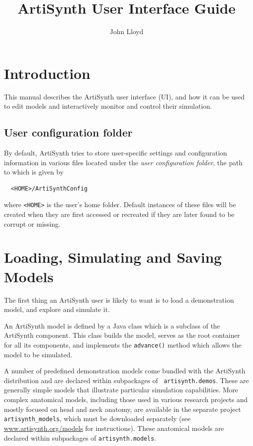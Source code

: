 \documentclass{article}
\title{ArtiSynth User Interface Guide}
\author{John Lloyd}
\date{}
\begin{document}
\maketitle

\iflatexml{\large\pubdate}\fi

\tableofcontents

\section{Introduction}

This manual describes the ArtiSynth user interface (UI), and how it
can be used to edit models and interactively monitor and control their
simulation.

\subsection{User configuration folder}
\label{UserConfig:sec}

By default, ArtiSynth tries to store user-specific settings and
configuration information in various files located under the {\it user
configuration folder}, the path to which is given by
%
\begin{verbatim}
  <HOME>/ArtiSynthConfig
\end{verbatim}
%
where {\tt <HOME>} is the user's home folder. Default instances of
these files will be created when they are first accessed or recreated
if they are later found to be corrupt or missing.

\section{Loading, Simulating and Saving Models}

The first thing an ArtiSynth user is likely to want is to load a
demonstration model, and explore and simulate it.

An ArtiSynth model is defined by a Java class which is a subclass of
the ArtiSynth 
component. This class builds the model, serves as the root container
for all its components, and implements the {\tt advance()} method
which allows the model to be simulated.

A number of predefined demonstration models come bundled with the
ArtiSynth distribution and are declared within subpackages of {\tt
artisynth.demos}. These are generally simple models that illustrate
particular simulation capabilities. More complex anatomical models,
including those used in various research projects and mostly focused
on head and neck anatomy, are available in the separate project {\tt
artisynth\_models}, which must be downloaded separately (see
\href{http://www.artisynth.org/models}{www.artisynth.org/models} for
instructions). These anatomical models are declared within subpackages
of {\tt artisynth.models}.
\end{document}

